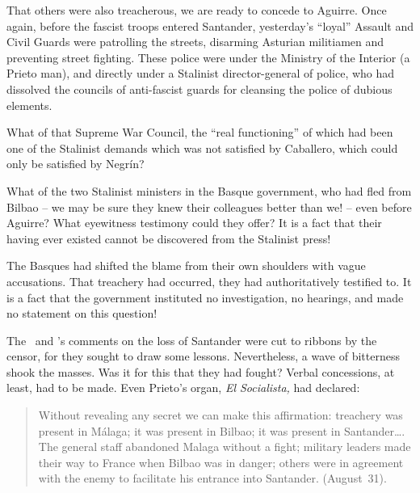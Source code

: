 \begin{sloppypar}
  That others were also treacherous, we are ready to concede to Aguirre. Once again, before the fascist troops entered Santander, yesterday’s ``loyal'' Assault and Civil Guards were patrolling the streets, disarming Asturian militiamen and preventing street fighting. These police were under the Ministry of the Interior (a Prieto man), and directly under a Stalinist director-general of police, who had dissolved the councils of anti-fascist guards for cleansing the police of dubious elements.

  What of that Supreme War Council, the ``real functioning'' of which had been one of the Stalinist demands which was not satisfied by Caballero, which could only be satisfied by Negr\'in?
\end{sloppypar}

What of the two Stalinist ministers in the Basque government, who had fled from Bilbao -- we may be sure they knew their colleagues better than we! -- even before Aguirre? What eyewitness testimony could they offer? It is a fact that their having ever existed cannot be discovered from the Stalinist press!%

The Basques had shifted the blame from their own shoulders with vague accusations. That treachery had occurred, they had authoritatively testified to. It is a fact that the government instituted no investigation, no hearings, and made no statement on this question!

The \UGT\ and \CNT’s comments on the loss of Santander were cut to ribbons by the censor, for they sought to draw some lessons. Nevertheless, a wave of bitterness shook the masses. Was it for this that they had fought? Verbal concessions, at least, had to be made. Even Prieto’s organ, \emph{El Socialista,} had declared: 

\begin{quotation}
  Without revealing any secret we can make this affirmation: treachery was present in M\'alaga; it was present in Bilbao; it was present in Santander\dots. The general staff abandoned Malaga without a fight; military leaders made their way to France when Bilbao was in danger; others were in agreement with the enemy to facilitate his entrance into Santander. (August~31).
\end{quotation}

